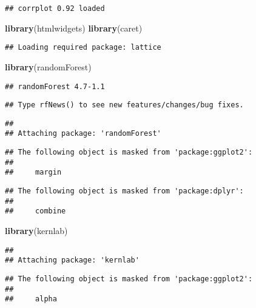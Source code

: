 \documentclass[
]{article}
\newenvironment{Shaded}{\begin{snugshade}}{\end{snugshade}}
\newcommand{\FunctionTok}[1]{\textcolor[rgb]{0.13,0.29,0.53}{\textbf{#1}}}
\newcommand{\NormalTok}[1]{#1}
\begin{document}
\begin{verbatim}
## corrplot 0.92 loaded
\end{verbatim}

\begin{Shaded}
\begin{Highlighting}[]
\FunctionTok{library}\NormalTok{(htmlwidgets)}
\FunctionTok{library}\NormalTok{(caret)}
\end{Highlighting}
\end{Shaded}

\begin{verbatim}
## Loading required package: lattice
\end{verbatim}

\begin{Shaded}
\begin{Highlighting}[]
\FunctionTok{library}\NormalTok{(randomForest)}
\end{Highlighting}
\end{Shaded}

\begin{verbatim}
## randomForest 4.7-1.1
\end{verbatim}

\begin{verbatim}
## Type rfNews() to see new features/changes/bug fixes.
\end{verbatim}

\begin{verbatim}
## 
## Attaching package: 'randomForest'
\end{verbatim}

\begin{verbatim}
## The following object is masked from 'package:ggplot2':
## 
##     margin
\end{verbatim}

\begin{verbatim}
## The following object is masked from 'package:dplyr':
## 
##     combine
\end{verbatim}

\begin{Shaded}
\begin{Highlighting}[]
\FunctionTok{library}\NormalTok{(kernlab)}
\end{Highlighting}
\end{Shaded}

\begin{verbatim}
## 
## Attaching package: 'kernlab'
\end{verbatim}

\begin{verbatim}
## The following object is masked from 'package:ggplot2':
## 
##     alpha
\end{verbatim}
\end{document}
